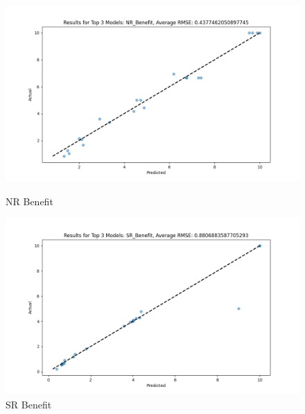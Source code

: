 \begin{figure}[H]
    \centering
    \begin{minipage}{0.495\textwidth}
        \centering
        \includegraphics[width=\linewidth]{reg_section_specxtra/images_reg_ensemble/ensemble_learning_rmse_plot_top_3_Models_NR_Benefit.png}
        \caption{NR Benefit}
        \label{fig:nr_ben_ensemble}
    \end{minipage}\hfill
    \begin{minipage}{0.495\textwidth}
        \centering
        \includegraphics[width=\linewidth]{reg_section_specxtra/images_reg_ensemble/ensemble_learning_rmse_plot_top_3_Models_SR_Benefit.png}
        \caption{SR Benefit}
        \label{fig:sr_ben_ensemble}
    \end{minipage}
\end{figure}

